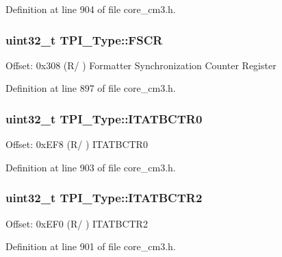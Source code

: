 Definition at line 904 of file core\+\_\+cm3.\+h.

\subsubsection[{\texorpdfstring{F\+S\+CR}{FSCR}}]{ uint32\+\_\+t T\+P\+I\+\_\+\+Type\+::\+F\+S\+CR}\hypertarget{structTPI__Type_a377b78fe804f327e6f8b3d0f37e7bfef}{}\label{structTPI__Type_a377b78fe804f327e6f8b3d0f37e7bfef}
Offset\+: 0x308 (R/ ) Formatter Synchronization Counter Register 

Definition at line 897 of file core\+\_\+cm3.\+h.

\subsubsection[{\texorpdfstring{I\+T\+A\+T\+B\+C\+T\+R0}{ITATBCTR0}}]{ uint32\+\_\+t T\+P\+I\+\_\+\+Type\+::\+I\+T\+A\+T\+B\+C\+T\+R0}\hypertarget{structTPI__Type_a20ca7fad4d4009c242f20a7b4a44b7d0}{}\label{structTPI__Type_a20ca7fad4d4009c242f20a7b4a44b7d0}
Offset\+: 0x\+E\+F8 (R/ ) I\+T\+A\+T\+B\+C\+T\+R0 

Definition at line 903 of file core\+\_\+cm3.\+h.

\subsubsection[{\texorpdfstring{I\+T\+A\+T\+B\+C\+T\+R2}{ITATBCTR2}}]{ uint32\+\_\+t T\+P\+I\+\_\+\+Type\+::\+I\+T\+A\+T\+B\+C\+T\+R2}\hypertarget{structTPI__Type_a176d991adb4c022bd5b982a9f8fa6a1d}{}\label{structTPI__Type_a176d991adb4c022bd5b982a9f8fa6a1d}
Offset\+: 0x\+E\+F0 (R/ ) I\+T\+A\+T\+B\+C\+T\+R2 

Definition at line 901 of file core\+\_\+cm3.\+h.

